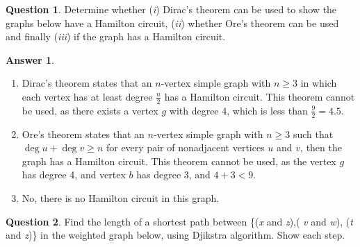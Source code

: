\documentclass[article, 12pt]{article}
\theoremstyle{definition}
\newtheorem{question}{Question}
\newtheorem{answer}{Answer}
\begin{document}
    \begin{question}
        Determine whether  ({\em i}) Dirac's theorem can be used to show  the graphs below have a Hamilton circuit, ({\em ii}) whether Ore's theorem can be used and finally ({\em iii}) if the graph has a Hamilton circuit.
        \begin{figure}[H]
            \centering
        \end{figure}
    \end{question}

    \begin{answer} \ 
        \begin{enumerate}[\em i)]
            \item Dirac's theorem states that an $n$-vertex simple graph with $n \geq 3$ in which each vertex has at least degree $\frac{n}{2}$ has a Hamilton circuit. This theorem cannot be used, as there exists a vertex $g$ with degree 4, which is less than $\frac{9}{2} = 4.5$.
            \item Ore's theorem states that an $n$-vertex simple graph with $n \geq 3$ such that $\deg{u} + \deg{v} \geq n$ for every pair of nonadjacent vertices $u$ and $v$, then the graph has a Hamilton circuit. This theorem cannot be used, as the vertex $g$ has degree 4, and vertex $b$ has degree 3, and $4+3 < 9$.
            \item No, there is no Hamilton circuit in this graph.
        \end{enumerate}    
    \end{answer}

    \begin{question}
        Find the length of a shortest path between \{({\it x} and {\it z}),( {\it v} and {\it w}), ({\it t} and {\it z})\} in the weighted graph below, using Djikstra algorithm. Show each step.
        \begin{figure}[H]
            \centering
        \end{figure}
    \end{question}
    
\end{document}
